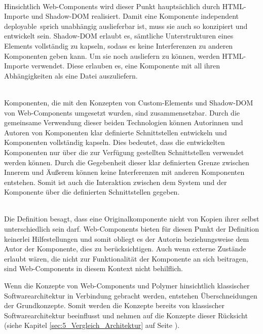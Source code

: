 \begin{enumerate}

\hfill \\
Hinsichtlich Web-Components wird dieser Punkt hauptsächlich durch HTML-Importe und Shadow-DOM  realisiert. Damit eine Komponente \glqq independent deployable\grqq\ sprich unabhängig auslieferbar ist, muss sie auch so konzipiert und entwickelt sein. Shadow-DOM erlaubt es, sämtliche Unterstrukturen eines Elements vollständig zu kapseln, sodass es keine Interferenzen zu anderen Komponenten geben kann. Um sie noch ausliefern zu können, werden HTML-Importe verwendet. Diese erlauben es, eine Komponente mit all ihren Abhängigkeiten als eine Datei auszuliefern.

 \hfill \\
Komponenten, die mit den Konzepten von Custom-Elements und Shadow-DOM von Web-Components umgesetzt wurden, sind zusammensetzbar. Durch die gemeinsame Verwendung dieser beiden Technologien können Autorinnen und Autoren von Komponenten klar definierte Schnittstellen entwickeln und Komponenten vollständig kapseln. Dies bedeutet, dass die entwickelten Komponenten nur über die zur Verfügung gestellten Schnittstellen verwendet werden können. Durch die Gegebenheit dieser klar definierten Grenze zwischen Innerem und Äußerem können keine Interferenzen mit anderen Komponenten entstehen. Somit ist auch die Interaktion zwischen dem System und der Komponente über die definierten Schnittstellen gegeben.

\hfill \\
Die Definition besagt, dass eine Originalkomponente nicht von Kopien ihrer selbst unterschiedlich sein darf. Web-Components bieten für diesen Punkt der Definition keinerlei Hilfestellungen und somit obliegt es der Autorin beziehungsweise dem Autor der Komponente, dies zu berücksichtigen.
Auch wenn externe Zustände erlaubt wären, die nicht zur Funktionalität der Komponente an sich beitragen, sind Web-Components in diesem Kontext nicht behilflich.

\end{enumerate}

Wenn die Konzepte von Web-Components und Polymer hinsichtlich klassischer Softwarearchitektur in Verbindung gebracht werden, entstehen Überschneidungen der Grundkonzepte. Somit werden die Konzepte bereits von klassischer Softwarearchitektur beeinflusst und nehmen auf die Konzepte dieser Rücksicht (siehe Kapitel \ref{sec:5_Vergleich_Architektur} auf Seite \pageref{sec:5_Vergleich_Architektur}).


